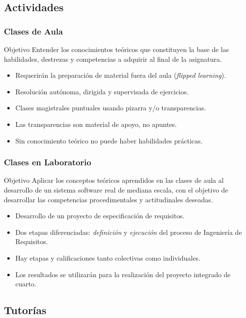 \documentclass[a4paper,slidestop,xcolor=pst,dvips,blue]{beamer}
\begin{document}
\subsection{Actividades}

\begin{frame}
	\frametitle{Clases de Aula}
	\begin{block}{Objetivo}
        Entender los conocimientos teóricos que constituyen la base de las habilidades, destrezas y competencias a adquirir al final de la asignatura.
	\end{block}
	\begin{itemize}
        \item<2-> Requerirán la preparación de material fuera del aula (\emph{flipped learning}).
		\item<3-> Resolución autónoma, dirigida y supervisada de ejercicios.
		\item<4-> Clases magistrales puntuales usando pizarra y/o transparencias.
		\item<5-> Las \alert{transparencias} son material de apoyo, \alert{no apuntes}.
		\item<6-> \alert{Sin conocimiento teórico no puede haber habilidades prácticas}.
	\end{itemize}
\end{frame}

\begin{frame}[c]
	\frametitle{Clases en Laboratorio}
	\begin{block}{Objetivo}
		Aplicar los conceptos teóricos aprendidos en las clases de aula al desarrollo de un sistema software real de mediana escala, con el objetivo
        de desarrollar las competencias procedimentales y actitudinales deseadas.
	\end{block}
	\begin{itemize}
        \item<2-> Desarrollo de un proyecto de especificación de requisitos.
		\item<3-> Dos etapas diferenciadas: \emph{definición} y \emph{ejecución} del proceso de Ingeniería de Requisitos.
        \item<4-> Hay etapas y calificaciones tanto colectivas como individuales.
        \item<5-> Los resultados se utilizarán para la realización del proyecto integrado de cuarto.
	\end{itemize}
\end{frame}

\subsection{Tutorías}
\end{document}
